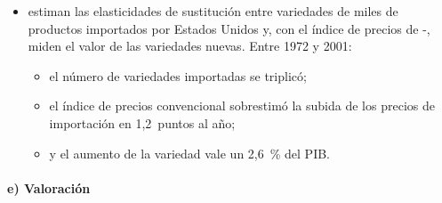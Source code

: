 \documentclass[11pt]{article}
\begin{document}
\begin{itemize}
\item \textcite{BrodaWeinstein2006Globalization} estiman las elasticidades de sustitución entre variedades de miles de productos importados por Estados Unidos y, con el índice de precios de -, miden el valor de las variedades nuevas. Entre 1972 y 2001:
  \begin{itemize}
  \item el número de variedades importadas se triplicó;
  \item el índice de precios convencional sobrestimó la subida de los precios de importación en 1,2~puntos al año;
  \item y el aumento de la variedad vale un 2,6~\% del PIB.
  \end{itemize}
\end{itemize}

\paragraph{e) Valoración}
\end{document}
